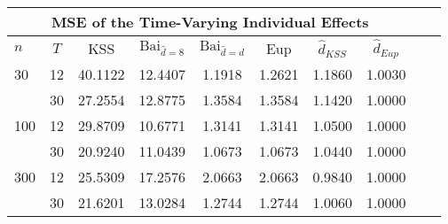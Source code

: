 \begin{tabular}{lccccccccc} 
\hline \multicolumn{8}{c}{MSE of the Time-Varying Individual Effects} \\ \hline 
$n$ & $T$ & KSS & $ \text{Bai}_{\hat{d} = 8}$ & $\text{Bai}_{\hat{d} = d}$ & Eup & $\hat{d}_{KSS}$ & $\hat{d}_{Eup}$ \\
\hline
30 & 12 &  40.1122  &  12.4407  &  1.1918  &  1.2621  &  1.1860  &  1.0030  \\
& 30 &  27.2554  &  12.8775  &  1.3584  &  1.3584  &  1.1420  &  1.0000  \\
100 & 12 &  29.8709  &  10.6771  &  1.3141  &  1.3141  &  1.0500  &  1.0000  \\
& 30 &  20.9240  &  11.0439  &  1.0673  &  1.0673  &  1.0440  &  1.0000  \\
300 & 12 &  25.5309  &  17.2576  &  2.0663  &  2.0663  &  0.9840  &  1.0000  \\
& 30 &  21.6201  &  13.0284  &  1.2744  &  1.2744  &  1.0060  &  1.0000  \\
\end{tabular} 
